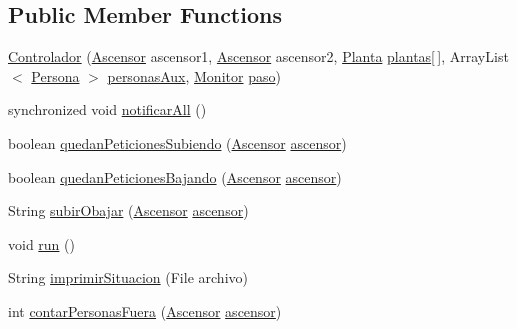 \subsection*{Public Member Functions}
\begin{DoxyCompactItemize}
\item 
\mbox{\hyperlink{classpecl6part1_1_1_controlador_a12360cf104ca852d3823f72282668406}{Controlador}} (\mbox{\hyperlink{classpecl6part1_1_1_ascensor}{Ascensor}} ascensor1, \mbox{\hyperlink{classpecl6part1_1_1_ascensor}{Ascensor}} ascensor2, \mbox{\hyperlink{classpecl6part1_1_1_planta}{Planta}} \mbox{\hyperlink{classpecl6part1_1_1_controlador_af8149da8845735945b38d7a29a50e397}{plantas}}\mbox{[}$\,$\mbox{]}, Array\+List$<$ \mbox{\hyperlink{classpecl6part1_1_1_persona}{Persona}} $>$ \mbox{\hyperlink{classpecl6part1_1_1_controlador_a2326908271d514b5346c7091584c0e92}{personas\+Aux}}, \mbox{\hyperlink{classpecl6part1_1_1_monitor}{Monitor}} \mbox{\hyperlink{classpecl6part1_1_1_controlador_af51f3a80f264d4175c0381f8b5e8edc0}{paso}})
\item 
synchronized void \mbox{\hyperlink{classpecl6part1_1_1_controlador_ae0f488e5a6c01ceb3afbd15cc924c8ab}{notificar\+All}} ()
\item 
boolean \mbox{\hyperlink{classpecl6part1_1_1_controlador_a3b5200d9999ffc177386a3e115fd65e8}{quedan\+Peticiones\+Subiendo}} (\mbox{\hyperlink{classpecl6part1_1_1_ascensor}{Ascensor}} \mbox{\hyperlink{classpecl6part1_1_1_controlador_ab1a946290b47216d355b09da476486db}{ascensor}})
\item 
boolean \mbox{\hyperlink{classpecl6part1_1_1_controlador_ae0f86b8248c267efc70501c7feb465b2}{quedan\+Peticiones\+Bajando}} (\mbox{\hyperlink{classpecl6part1_1_1_ascensor}{Ascensor}} \mbox{\hyperlink{classpecl6part1_1_1_controlador_ab1a946290b47216d355b09da476486db}{ascensor}})
\item 
String \mbox{\hyperlink{classpecl6part1_1_1_controlador_a95c13a9d652492249ed581fce7756392}{subir\+Obajar}} (\mbox{\hyperlink{classpecl6part1_1_1_ascensor}{Ascensor}} \mbox{\hyperlink{classpecl6part1_1_1_controlador_ab1a946290b47216d355b09da476486db}{ascensor}})
\item 
void \mbox{\hyperlink{classpecl6part1_1_1_controlador_a6eb5b70059a6cbcccc871edaac2f2c8d}{run}} ()
\item 
String \mbox{\hyperlink{classpecl6part1_1_1_controlador_aa62f73857e81fc76b5621497d0e10149}{imprimir\+Situacion}} (File archivo)
\item 
int \mbox{\hyperlink{classpecl6part1_1_1_controlador_a75fe6203d44f191bbad90238d1b6a00e}{contar\+Personas\+Fuera}} (\mbox{\hyperlink{classpecl6part1_1_1_ascensor}{Ascensor}} \mbox{\hyperlink{classpecl6part1_1_1_controlador_ab1a946290b47216d355b09da476486db}{ascensor}})
\end{DoxyCompactItemize}
